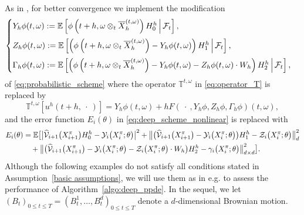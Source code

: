 \documentclass[12pt]{article}
\numberwithin{equation}{section}
\newcommand{\E}{\mathbb{E}}
\let\oldcitet=\citet
\renewcommand{\cite}[1]{\textcolor[rgb]{0,0,1}{\oldcitet{#1}}}
\renewcommand{\citet}[1]{\textcolor[rgb]{0,0,1}{\oldcitet{#1}}}
\begin{document}
\medskip

 As in \cite{alanko2013reducing},
 for better convergence we implement the modification
\begin{equation*}
        \begin{cases}
        Y_h\phi(t, \omega) := \mathbb{E} \left[ \phi\left(t+h,
          \omega \otimes_{t} \overline{X}^{(t,\omega)}_h\right) H^h_0
          \ \! \Big| \ \! \mathcal{F}_t \right],
        \medskip \\
        Z_h\phi(t, \omega) := \mathbb{E} \left[ \left( \phi\left(t+h,
                        \omega \otimes_{t} \overline{X}^{(t,\omega)}_h\right)  -
                        Y_h\phi(t, \omega) \right) H^h_1
                        \ \! \Big| \ \! \mathcal{F}_t
                        \right],
        \medskip \\
        \Gamma_h\phi(t, \omega) := \mathbb{E} \left[ \left( \phi\left(t+h,
                        \omega \otimes_{t} \overline{X}^{(t,\omega)}_h\right)  - Y_h\phi(t, \omega)
                        - Z_h\phi(t, \omega) \cdot W_h \right) H^h_2
                        \ \! \Big| \ \! \mathcal{F}_t
                        \right],
        \end{cases}
    \end{equation*}
of \eqref{eq:probabilistic_scheme}
    where the operator $\mathbb{T}^{t,\omega}$
    in \eqref{eq:operator_T}
    is replaced by
    \begin{equation}
    \label{eq:var_reduced_probabilistic_scheme}
    \mathbb{T}^{t,\omega}\left[u^h(t+h, \ \! \cdot \ \! )\right]
        = Y_h\phi(t, \omega) + hF\left(\ \! \cdot \ \! , Y_h\phi, Z_h\phi, \Gamma_h\phi \right)(t,\omega),
    \end{equation}
    and the error function $E_i(\theta)$
    in \eqref{eq:deep_scheme_nonlinear} is replaced with
    \begin{align}
	\nonumber
        E_i(\theta) & =  \E \bigl[ \big\lvert \widehat{\cal V}_{i+1}\big(X^\pi_{i+1}\big) H_0^h - {\cal Y}_i\big(X^\pi_i;\theta\big)\big\rvert^2
            + \big\lVert \big( \widehat{\cal V}_{i+1}\big(X^\pi_{i+1}\big) - {\cal Y}_i\big(X^\pi_i;\theta\big) \big)H_1^h - {\cal Z}_i\big(X^\pi_i;\theta\big)\big\rVert_d^2
    \\
    \label{eq:var_reduced_deep_scheme_nonlinear}
            & \quad + \big\lVert \big( \widehat{\cal V}_{i+1}\big(X^\pi_{i+1}\big)
                        - {\cal Y}_i\big(X^\pi_i;\theta\big)
                        - {\cal Z}_i\big(X^\pi_i;\theta\big) \cdot W_h \big) H_2^h
                    - {\cal \gamma}_i\big(X^\pi_i;\theta\big)\big\rVert_{d\times d}^2\bigr].
    \end{align}
  Although the following examples do not satisfy all
  conditions stated in Assumption~\ref{basic assumptions},
  we will use them as in e.g. \cite{ren2017convergence}
  to assess the performance of  Algorithm~\ref{algo:deep_ppde}.
   In the sequel, we let
    $(B_t)_{0 \leq t \leq T} = (B^1_t, \dots, B^d_t)_{0 \leq t \leq T}$
  denote a $d$-dimensional Brownian motion.
\end{document}
